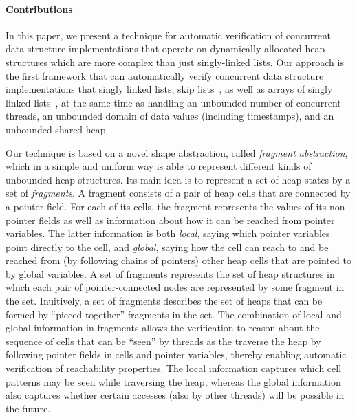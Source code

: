 
\paragraph{Contributions}
In this paper, we present a technique for automatic verification of concurrent
data structure implementations that operate on dynamically allocated
heap structures which are more complex than just singly-linked lists.
Our approach is the first framework that
can automatically verify concurrent data structure implementations that
singly linked lists, skip lists~\cite{Fomitchev:2004,ArtOfMpP,Sundell:2005},
as well as arrays of singly linked lists~\cite{ts-stack},
at the same time as handling an unbounded
number of concurrent threads, an unbounded domain of data values
(including timestamps), and an unbounded shared heap.

Our technique is based on a novel shape abstraction,
called {\em fragment abstraction}, which in a simple and uniform way is able to
represent different kinds of unbounded heap structures.
Its main idea is to represent a set of heap states by a set of {\em fragments}.
A fragment consists of a pair of heap cells that are connected by a pointer field.
For each of its cells, the fragment represents
the values of its non-pointer
fields as well as information about how it can be reached from pointer
variables. The latter information is both {\em local}, saying which pointer
variables point directly to the cell, and {\em global}, saying how the
cell can reach to and be reached from (by following chains of pointers)
other heap cells that are pointed to by global variables.
A set of fragments represents the set of heap
structures in which each pair of pointer-connected nodes are represented by some
fragment in the set.
Inuitively, a set of fragments describes the set of heaps that can be formed by
``pieced together'' fragments in the set.
The combination of local and global information in fragments allows the
verification to reason about the sequence of cells that can be ``seen'' by
threads as the traverse the heap by following pointer fields in cells and
pointer variables, thereby enabling automatic verification of reachability
properties. The local information captures which cell patterns may be
seen while traversing the heap, whereas the global information also
captures whether certain accesses (also by other threads) will be possible
in the future. 

